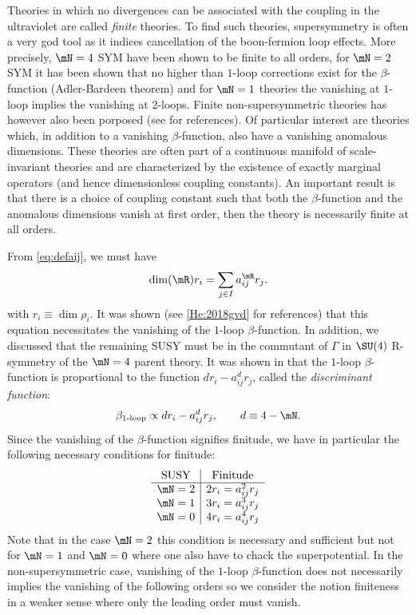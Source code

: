 \documentclass{worksheetclass}
\begin{document}
    Theories in which no divergences can be associated with the coupling in the ultraviolet are called \emph{finite} theories. To find such theories, supersymmetry is often a very god tool as it indices cancellation of the boon-fermion loop effects. More precisely, $\mN=4$ SYM have been shown to be finite to all orders, for $\mN=2$ SYM it has been shown that no higher than $1$-loop corrections exist for the $\beta$-function (Adler-Bardeen theorem) and for $\mN=1$ theories the vanishing at $1$-loop implies the vanishing at $2$-loops. Finite non-supersymmetric theories has however also been porposed (see \cite{He:2018gvd} for references). Of particular interest are theories which, in addition to a vanishing $\beta$-function, also have a vanishing anomalous dimensions. These theories are often part of a continuous manifold of scale-invariant theories and are characterized by the existence of exactly marginal operators (and hence dimensionless coupling constants). An important result is that there is a choice of coupling constant such that both the $\beta$-function and the anomalous dimensions vanish at first order, then the theory is necessarily finite at all orders.

    From \eqref{eq:defaij}, we must have
    \begin{equation}
        \dim(\mR)r_i=\sum_{j\in I}a^{\mR}_{ij}r_j.
    \end{equation}
    with $r_i\equiv\dim\rho_i$. It was shown (see \ref{He:2018gvd} for references) that this equation necessitates the vanishing of the $1$-loop $\beta$-function. In addition, we discussed that the remaining SUSY must be in the commutant of $\Gamma$ in $\SU(4)$ R-symmetry of the $\mN=4$ parent theory. It was shown in \cite{vafa1998,https://doi.org/10.48550/arxiv.hep-th/9706110} that the $1$-loop $\beta$-function is proportional to the function $dr_i-a^d_{ij}r_j$, called the \emph{discriminant function}:
    \begin{equation*}
        \beta_{1\text{-loop}}\propto dr_i-a^d_{ij}r_j,\qquad d\equiv 4-\mN.
    \end{equation*}
    Since the vanishing of the $\beta$-function signifies finitude, we have in particular the following necessary conditions for finitude:
    \begin{equation*}
        \begin{array}{c|c}
            \text{SUSY} & \text{Finitude} \\ \hline
            \mN=2 & 2r_i = a^2_{ij}r_j \\
            \mN=1 & 3r_i = a^3_{ij}r_j \\
            \mN=0 & 4r_i = a^4_{ij}r_j \\
        \end{array}
    \end{equation*}
    Note that in the case $\mN=2$ this condition is necessary and sufficient but not for $\mN=1$ and $\mN=0$ where one also have to chack the superpotential. In the non-supersymmetric case, vanishing of the $1$-loop $\beta$-function does not necessarily implies the vanishing of the following orders so we consider the notion finiteness in a weaker sense where only the leading order must vanish.
\end{document}
